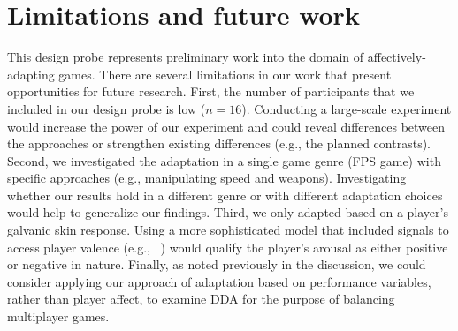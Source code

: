 \section{Limitations and future work}
This design probe represents preliminary work into the domain of affectively-adapting games. There are several limitations in our work that present opportunities for future research. First, the number of participants that we included in our design probe is low ($n=16$). Conducting a large-scale experiment would increase the power of our experiment and could reveal differences between the approaches or strengthen existing differences (e.g., the planned contrasts). Second, we investigated the adaptation in a single game genre (FPS game) with specific approaches (e.g., manipulating speed and weapons). Investigating whether our results hold in a different genre or with different adaptation choices would help to generalize our findings. Third, we only adapted based on a player's galvanic skin response. Using a more sophisticated model that included signals to access player valence (e.g., ~\cite{mandryk2007fuzzy}) would qualify the player's arousal as either positive or negative in nature. Finally, as noted previously in the discussion, we could consider applying our approach of adaptation based on performance variables, rather than player affect, to examine DDA for the purpose of balancing multiplayer games.
